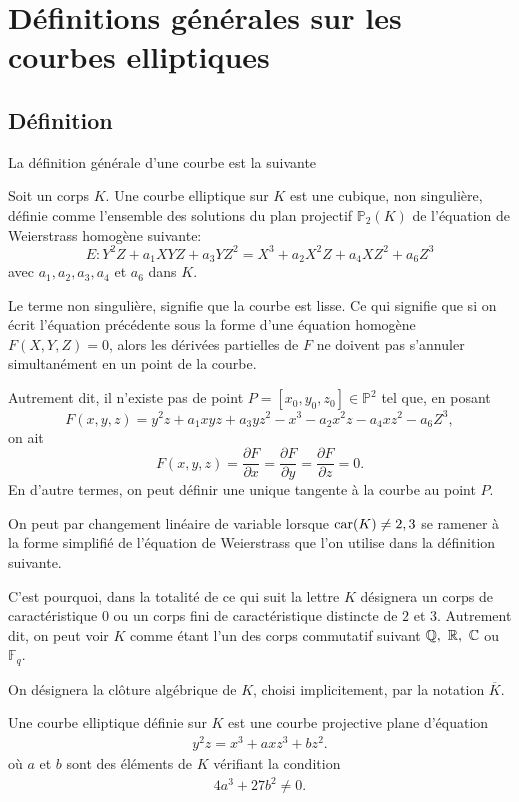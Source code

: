 \chapter{Définitions générales sur les courbes elliptiques}

\section{Définition}

La définition générale d'une courbe est la suivante
\begin{definition}
    Soit un corps $K$. Une courbe elliptique sur $K$ est une cubique, non singulière,
    définie comme l'ensemble des solutions du plan projectif $\mathbb{P}_{2}(K)$ de
    l'équation de Weierstrass homogène suivante:
\[
\label{eq:geneEll}
E: Y^2Z+a_1XYZ+a_3YZ^2 = X^3 +a_2X^2Z+a_4XZ^2+a_6Z^3
\] 
avec $a_1,a_2,a_3,a_4$ et $a_6$ dans $K$.
\end{definition}
Le terme non singulière, signifie que la courbe est lisse. Ce qui signifie que si on écrit
l'équation précédente sous la forme d'une équation homogène $F(X,Y,Z)=0$, alors les dérivées
partielles de $F$ ne doivent pas s'annuler simultanément en un point de la courbe.

Autrement dit, il n'existe pas de point $P = \left[ x_0,y_0,z_0 \right] \in \mathbb{P}^2$ tel
que, en posant
\[
F(x,y,z) = y^2z+a_1xyz+a_3yz^2 - x^3-a_2x^2z-a_4xz^2-a_6Z^3
,\] 
on ait
\[
F(x,y,z)=\frac{\partial{F}}{\partial{x}} = \frac{\partial{F}}{\partial{y}} =
\frac{\partial{F}}{\partial{z}} = 0
.\] 
En d'autre termes, on peut définir une unique tangente à la courbe au point $P$.

On peut par changement linéaire de variable lorsque $\operatorname{car}(K) \neq 2,3$ se ramener à la forme
simplifié de l'équation de Weierstrass que l'on utilise dans la définition suivante.

C'est pourquoi, dans la totalité de ce qui suit la lettre $K$ désignera un corps de caractéristique $0$ ou un
corps fini de caractéristique distincte de $2$ et $3$. Autrement dit, on peut voir $K$
comme étant l'un des corps commutatif suivant $\mathbb{Q},\ \mathbb{R},\ \mathbb{C}$ ou $\mathbb{F}_{q}$.

On désignera la clôture algébrique de $K$, choisi implicitement, par la notation $\overline{K}$.

\begin{definition}
    \label{def:ell}
    Une courbe elliptique définie sur $K$ est une courbe projective plane d'équation
    \begin{align}
        \label{eq:ell}
    y^2z=x^3+axz^3+bz^2
    .\end{align}
    où $a$ et $b$ sont des éléments de $K$ vérifiant la condition
    \begin{align}
        \label{eq:delta}
    4a^3+27b^2\neq 0
    .\end{align}
\end{definition}

